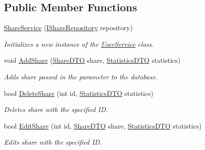 \subsection*{Public Member Functions}
\begin{DoxyCompactItemize}
\item 
\mbox{\hyperlink{class_gielda_l2_1_1_i_n_f_r_a_s_t_r_u_c_t_u_r_e_1_1_services_1_1_share_service_a962d3e4973cb768f95f619bea0c06173}{Share\+Service}} (\mbox{\hyperlink{interface_gielda_l2_1_1_d_b_1_1_interfaces_1_1_i_share_repository}{I\+Share\+Repository}} repository)
\begin{DoxyCompactList}\small\item\em Initializes a new instance of the \mbox{\hyperlink{class_gielda_l2_1_1_i_n_f_r_a_s_t_r_u_c_t_u_r_e_1_1_services_1_1_user_service}{User\+Service}} class. \end{DoxyCompactList}\item 
void \mbox{\hyperlink{class_gielda_l2_1_1_i_n_f_r_a_s_t_r_u_c_t_u_r_e_1_1_services_1_1_share_service_a9b880f273e42a748d5f0ee70d8c4ee0a}{Add\+Share}} (\mbox{\hyperlink{class_gielda_l2_1_1_i_n_f_r_a_s_t_r_u_c_t_u_r_e_1_1_d_t_o_1_1_share_d_t_o}{Share\+D\+TO}} share, \mbox{\hyperlink{class_gielda_l2_1_1_i_n_f_r_a_s_t_r_u_c_t_u_r_e_1_1_d_t_o_1_1_statistics_d_t_o}{Statistics\+D\+TO}} statistics)
\begin{DoxyCompactList}\small\item\em Adds share passed in the parameter to the database. \end{DoxyCompactList}\item 
bool \mbox{\hyperlink{class_gielda_l2_1_1_i_n_f_r_a_s_t_r_u_c_t_u_r_e_1_1_services_1_1_share_service_a2846452ec756a28a540b81c6a3f95685}{Delete\+Share}} (int id, \mbox{\hyperlink{class_gielda_l2_1_1_i_n_f_r_a_s_t_r_u_c_t_u_r_e_1_1_d_t_o_1_1_statistics_d_t_o}{Statistics\+D\+TO}} statistics)
\begin{DoxyCompactList}\small\item\em Deletes share with the specified ID. \end{DoxyCompactList}\item 
bool \mbox{\hyperlink{class_gielda_l2_1_1_i_n_f_r_a_s_t_r_u_c_t_u_r_e_1_1_services_1_1_share_service_a4aa9cb350fcf289c0564e57de8cc25af}{Edit\+Share}} (int id, \mbox{\hyperlink{class_gielda_l2_1_1_i_n_f_r_a_s_t_r_u_c_t_u_r_e_1_1_d_t_o_1_1_share_d_t_o}{Share\+D\+TO}} share, \mbox{\hyperlink{class_gielda_l2_1_1_i_n_f_r_a_s_t_r_u_c_t_u_r_e_1_1_d_t_o_1_1_statistics_d_t_o}{Statistics\+D\+TO}} statistics)
\begin{DoxyCompactList}\small\item\em Edits share with the specified ID. \end{DoxyCompactList}\item 

\end{DoxyCompactItemize}

